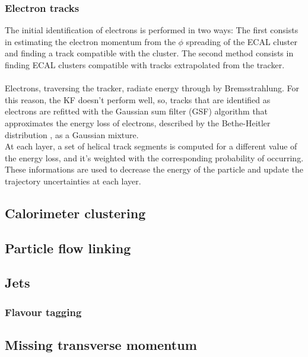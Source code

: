 \subsubsection*{Electron tracks}
The initial identification of electrons is performed in two ways:
The first consists in estimating the electron momentum from the $\phi$ spreading of the ECAL cluster and finding a track compatible with the cluster.
The second method consists in finding ECAL clusters compatible with tracks extrapolated  from the tracker.\\
\\
Electrons, traversing the tracker, radiate energy through by Bremsstrahlung. For this reason, the KF doesn't perform well, so, tracks that are identified as electrons are refitted with the Gaussian sum filter (GSF) algorithm that approximates the energy loss of electrons, described by the Bethe-Heitler distribution \ADDREF, as a Gaussian mixture.\\
At each layer, a set of helical track segments is computed for a different value of the energy loss, and it's weighted with the corresponding probability of occurring. These informations are used to decrease the energy of the particle and update the trajectory uncertainties at each layer.


\subsection{Calorimeter clustering}
\subsection{Particle flow linking}
\subsection{Jets}
\subsubsection*{Flavour tagging}
\subsection{Missing transverse momentum}

